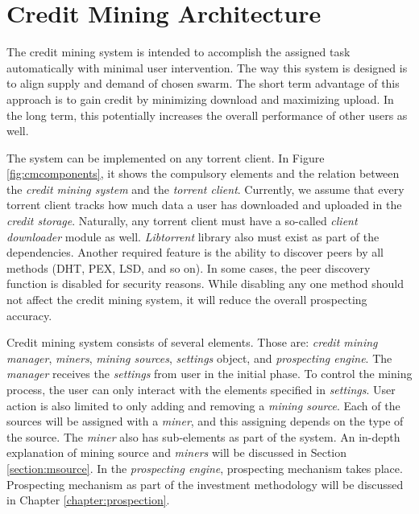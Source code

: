 \section{Credit Mining Architecture}
\label{section:cmcomponents}

The credit mining system is intended to accomplish the assigned task automatically with minimal user intervention. The way this system is designed is to align supply and demand of chosen swarm. The short term advantage of this approach is to gain credit by minimizing download and maximizing upload. In the long term, this potentially increases the overall performance of other users as well.

The system can be implemented on any torrent client. In Figure \ref{fig:cmcomponents}, it shows the compulsory elements and the relation between the \textit{credit mining system} and the \textit{torrent client}. Currently, we assume that every torrent client tracks how much data a user has downloaded and uploaded in the \textit{credit storage}. Naturally, any torrent client must have a so-called \textit{client downloader} module as well. \textit{Libtorrent} library also must exist as part of the dependencies. Another required feature is the ability to discover peers by all methods (DHT, PEX, LSD, and so on). In some cases, the peer discovery function is disabled for security reasons. While disabling any one method should not affect the credit mining system, it will reduce the overall prospecting accuracy.

Credit mining system consists of several elements. Those are: \textit{credit mining manager}, \textit{miners}, \textit{mining sources}, \textit{settings} object, and \textit{prospecting engine}. The \textit{manager} receives the \textit{settings} from user in the initial phase. To control the mining process, the user can only interact with the elements specified in \textit{settings}. User action is also limited to only adding and removing a \textit{mining source}. Each of the sources will be assigned with a \textit{miner}, and this assigning depends on the type of the source. The \textit{miner} also has sub-elements as part of the system. An in-depth explanation of mining source and \textit{miners} will be discussed in Section \ref{section:msource}. In the \textit{prospecting engine}, prospecting mechanism takes place. Prospecting mechanism as part of the investment methodology will be discussed in Chapter \ref{chapter:prospection}.


